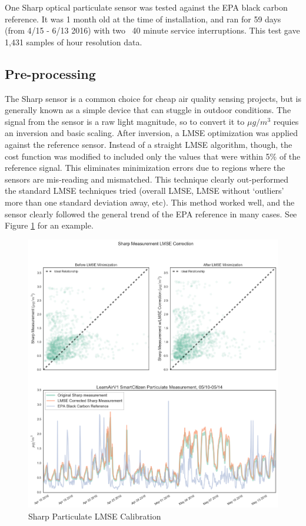 One Sharp optical particulate sensor was tested against the EPA black carbon reference.  It was 1 month old at the time of installation, and ran for 59 days (from 4/15 - 6/13 2016) with two ~40 minute service interruptions.  This test gave 1,431 samples of hour resolution data.


\subsection{Pre-processing}

The Sharp sensor is a common choice for cheap air quality sensing projects, but is generally known as a simple device that can stuggle in outdoor conditions.  The signal from the sensor is a raw light magnitude, so to convert it to $\mu g/m^3$ requies an inversion and basic scaling.  After inversion, a LMSE optimization was applied against the reference sensor.  Instead of a straight LMSE algorithm, though, the cost function was modified to included only the values that were within 5\% of the reference signal.  This eliminates minimization errors due to regions where the sensors are mis-reading and mismatched.  This technique clearly out-performed the standard LMSE techniques tried (overall LMSE, LMSE without `outliers' more than one standard deviation away, etc).    This method worked well, and the sensor clearly followed the general trend of the EPA reference in many cases.  See Figure \ref{fig:sharpDust_lmse} for an example.

\begin{figure}[htb]
 	\includegraphics[width=\textwidth]{figs/sharpDust_lmse}               
 	 \caption{Sharp Particulate LMSE Calibration}
  	\label{fig:sharpDust_lmse}
\end{figure}

